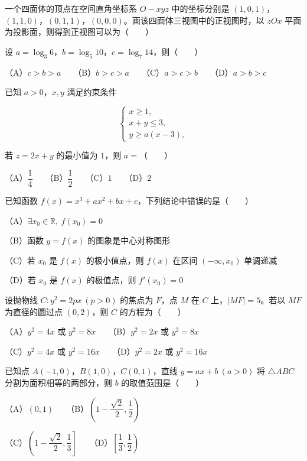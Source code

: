 \begin{question}
一个四面体的顶点在空间直角坐标系 $O-xyz$ 中的坐标分别是 $(1,0,1)$，$(1,1,0)$，$(0,1,1)$，$(0,0,0)$。画该四面体三视图中的正视图时，以 $zOx$ 平面为投影面，则得到正视图可以为\mbox{（　　）}
\nopagebreak[4]
\begin{center}\end{center}
\nopagebreak[4]
\end{question}
\begin{question}
设 $a=\log_3 6$，$b=\log_5 10$，$c=\log_7 14$，则\mbox{（　　）}

（A）$c>b>a$　　（B）$b>c>a$　　（C）$a>c>b$　　（D）$a>b>c$

\end{question}
\begin{question}
已知 $a>0$，$x,y$ 满足约束条件

\nopagebreak[4]
\[
\begin{cases}
x\geqslant1,\\
x+y\leqslant3,\\
y\geqslant a(x-3),
\end{cases}
\]

若 $z=2x+y$ 的最小值为 $1$，则 $a=$\mbox{（　　）}

（A）$\dfrac14$　　（B）$\dfrac12$　　（C）$1$　　（D）$2$

\end{question}
\begin{question}
已知函数 $f(x)=x^3+ax^2+bx+c$，下列结论中错误的是\mbox{（　　）}

（A）$\exists x_0\in\mathbb R,\ f(x_0)=0$

（B）函数 $y=f(x)$ 的图象是中心对称图形

（C）若 $x_0$ 是 $f(x)$ 的极小值点，则 $f(x)$ 在区间 $(-\infty,x_0)$ 单调递减

（D）若 $x_0$ 是 $f(x)$ 的极值点，则 $f'(x_0)=0$

\end{question}
\begin{question}
设抛物线 $C:y^2=2px\ (p>0)$ 的焦点为 $F$，点 $M$ 在 $C$ 上，$|MF|=5$。若以 $MF$ 为直径的圆过点 $(0,2)$，则 $C$ 的方程为\mbox{（　　）}

（A）$y^2=4x$ 或 $y^2=8x$　　（B）$y^2=2x$ 或 $y^2=8x$

（C）$y^2=4x$ 或 $y^2=16x$　　（D）$y^2=2x$ 或 $y^2=16x$

\end{question}
\begin{question}
已知点 $A(-1,0)$，$B(1,0)$，$C(0,1)$，直线 $y=ax+b\ (a>0)$ 将 $\triangle ABC$ 分割为面积相等的两部分，则 $b$ 的取值范围是\mbox{（　　）}

（A）$(0,1)$　　（B）$\left(1-\dfrac{\sqrt2}{2},\dfrac12\right)$

（C）$\left(1-\dfrac{\sqrt2}{2},\dfrac13\right]$　　（D）$\left[\dfrac13,\dfrac12\right)$

\end{question}

